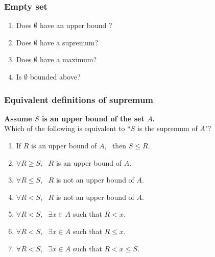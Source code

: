 \documentclass[14pt]{beamer}
\newcommand{\setsize}[1]{\fontsize{#1}{#1}\selectfont} %
\newcommand{\smallerfont}{\setsize{13}} %
\begin{document}
	\begin{frame}[t]
		\frametitle{Empty set}

		\begin{enumerate}
			\item Does $\emptyset$ have an upper bound ?

			\item Does $\emptyset$ have a supremum?

			\item Does $\emptyset$ have a maximum?

			\item Is $\emptyset$ bounded above?
		\end{enumerate}
	\end{frame}

	\begin{frame}[t]
		\smallerfont
		\frametitle{Equivalent definitions of supremum}

		{\bf Assume $S$ is an upper bound of the set $A$.} \\ Which of the following
		is equivalent to ``$S$ is the supremum of $A$"?
		\vspace{.2cm}
		\begin{enumerate}
			\item If $R$ is an upper bound of $A$, \, then $S \leq R$.
				\vspace{.2cm}

			\item ${\displaystyle \forall R \geq S}$, \, $R$ is an upper bound of $A$.

			\item ${\displaystyle \forall R \leq S}$, \, $R$ is not an upper bound of
				$A$.

			\item ${\displaystyle \forall R < S}$, \, $R$ is not an upper bound of $A$.
				\vspace{.2cm}

			\item ${\displaystyle \forall R < S}$, \,
				${\displaystyle \exists x \in A}$ \; such that \;
				${\displaystyle R < x }$.

			\item ${\displaystyle \forall R < S}$, \,
				${\displaystyle \exists x \in A}$ \; such that \;
				${\displaystyle R \leq x }$.

			\item ${\displaystyle \forall R < S}$, \,
				${\displaystyle \exists x \in A}$ \; such that \;
				${\displaystyle R < x \leq S}$.


\end{enumerate}
\end{frame}
\end{document}
